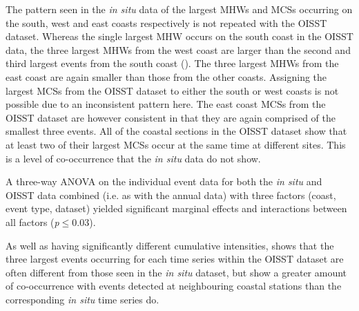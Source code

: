 \documentclass[a4paper,10pt,review]{elsarticle}
\begin{document}
The pattern seen in the \emph{in situ} data of the largest MHWs and MCSs occurring on the south, west and east coasts respectively is not repeated with the OISST dataset. Whereas the single largest MHW occurs on the south coast in the OISST data, the three largest MHWs from the west coast are larger than the second and third largest events from the south coast (). The three largest MHWs from the east coast are again smaller than those from the other coasts. Assigning the largest MCSs from the OISST dataset to either the south or west coasts is not possible due to an inconsistent pattern here. The east coast MCSs from the OISST dataset are however consistent in that they are again comprised of the smallest three events. All of the coastal sections in the OISST dataset show that at least two of their largest MCSs occur at the same time at different sites. This is a level of co-occurrence that the \emph{in situ} data do not show.

A three-way ANOVA on the individual event data for both the \emph{in situ} and OISST data combined (i.e. as with the annual data) with three factors (coast, event type, dataset) yielded significant marginal effects and interactions between all factors (\emph{p}$\leq$0.03).

As well as having significantly different cumulative intensities,  shows that the three largest events occurring for each time series within the OISST dataset are often different from those seen in the \emph{in situ} dataset, but show a greater amount of co-occurrence with events detected at neighbouring coastal stations than the corresponding \emph{in situ} time series do.
\end{document}
